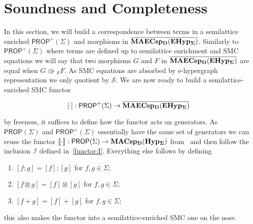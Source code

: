 
\section{Soundness and Completeness}

In this section, we will build a correspondence between terms in a semilattice enriched $\textsf{PROP}^{+}(\Sigma)$ and morphisms in ${\mathbf{\overline{MAECsp_{D}(EHyp_{\Sigma})}}}$.
Similarly to $\textsf{PROP}^{+}(\Sigma)$ where terms are defined up to semilattice enrichment and SMC equations we will say that two morphisms $G$ and $F$ in ${\mathbf{\overline{MAECsp_{D}(EHyp_{\Sigma})}}}$ are equal when $G \Rrightarrow{}_{\mathcal{S}} F$. 
As SMC equations are absorbed by e-hypergraph representation we only quotient by $\mathcal{S}$. 
We are now ready to build a semilattice-enriched SMC functor 

\[
[\cdot] : \textsf{PROP}^{+}(\Sigma) \to {\mathbf{\overline{MAECsp_{D}(EHyp_{\Sigma})}}}
\]

by freeness, it suffices to define how the functor acts on generators.
As $\textsf{PROP}(\Sigma)$ and $\textsf{PROP}^{+}(\Sigma)$ essentially have the same set of generators we can reuse the functor $\llbracket \cdot \rrbracket: \textsf{PROP}(\Sigma) \to {\mathbf{MACsp_{D}(Hyp_{\Sigma})}}$ from~\cite{Frobenius2} and then follow the inclusion $\mathcal{I}$ defined in~\ref{functor:I}.
Everything else follows by defining

\begin{enumerate}
    \item $[ f;g ] = [ f ] ; [ g ]$  for $f,g \in \Sigma$;
    \item $[ f \otimes g ] = [ f ] \otimes [ g ]$  for $f,g \in \Sigma$;
    \item $[ f + g ] = [ f ] + [ g ]$  for $f,g \in \Sigma$;
\end{enumerate}

this also makes the functor into a semilattice-enriched SMC one on the nose.


